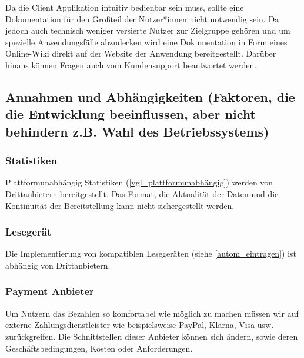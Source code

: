 Da die Client Applikation intuitiv bedienbar sein muss, sollte eine Dokumentation für den Großteil der Nutzer*innen nicht notwendig sein. Da jedoch auch technisch weniger versierte Nutzer zur Zielgruppe gehören und um spezielle Anwendungsfälle abzudecken wird eine Dokumentation in Form eines Online-Wiki direkt auf der Website der Anwendung bereitgestellt. Darüber hinaus können Fragen auch vom Kundensupport beantwortet werden.

\subsection{Annahmen und Abhängigkeiten (Faktoren, die die Entwicklung beeinflussen, aber nicht behindern z.B. Wahl des Betriebssystems)}


\subsubsection{Statistiken}
Plattformunabhängig Statistiken (\ref{vgl_plattformunabhängig}) werden von Drittanbietern bereitgestellt. Das Format, die Aktualität der Daten und die Kontinuität der Bereitstellung kann nicht sichergestellt werden.


\subsubsection{Lesegerät}
Die Implementierung von kompatiblen Lesegeräten (siehe \ref{autom_eintragen}) ist abhängig von Drittanbietern.
\subsubsection{Payment Anbieter}

Um Nutzern das Bezahlen so komfortabel wie möglich zu machen müssen wir auf externe Zahlungsdienstleister wie beispielsweise PayPal, Klarna, Visa usw. zurückgreifen. Die Schnittstellen dieser Anbieter können sich ändern, sowie deren Geschäftsbedingungen, Kosten oder Anforderungen.
